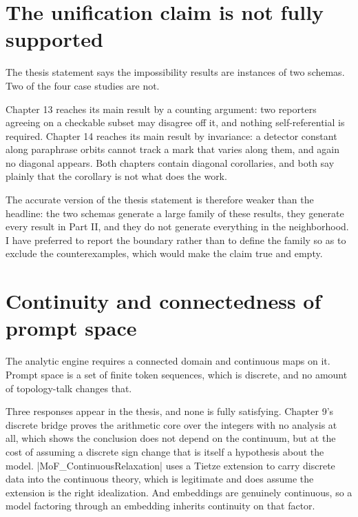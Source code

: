 \documentclass{memoir}
\begin{document}
\section{The unification claim is not fully supported}\label{Two--Schemas--of--Impossibility-005F-005F-005F--Machine--Checked--Limits--of--Trustworthy--Machine--Learning-005F-005F-005F--and--Why--They--Tighten--with--Capability----Limitations----The--unification--claim--is--not--fully--supported}

The thesis statement says the impossibility results are instances of two
schemas. Two of the four case studies are not.

Chapter 13 reaches its main result by a counting argument: two reporters
agreeing on a checkable subset may disagree off it, and nothing self-referential
is required. Chapter 14 reaches its main result by invariance: a detector
constant along paraphrase orbits cannot track a mark that varies along them, and
again no diagonal appears. Both chapters contain diagonal corollaries, and both
say plainly that the corollary is not what does the work.

The accurate version of the thesis statement is therefore weaker than the
headline: the two schemas generate a large family of these results, they
generate every result in Part II, and they do not generate everything in the
neighborhood. I have preferred to report the boundary rather than to define the
family so as to exclude the counterexamples, which would make the claim true and
empty.



\section{Continuity and connectedness of prompt space}\label{Two--Schemas--of--Impossibility-005F-005F-005F--Machine--Checked--Limits--of--Trustworthy--Machine--Learning-005F-005F-005F--and--Why--They--Tighten--with--Capability----Limitations----Continuity--and--connectedness--of--prompt--space}

The analytic engine requires a connected domain and continuous maps on it.
Prompt space is a set of finite token sequences, which is discrete, and no
amount of topology-talk changes that.

Three responses appear in the thesis, and none is fully satisfying. Chapter 9's
discrete bridge proves the arithmetic core over the integers with no analysis at
all, which shows the conclusion does not depend on the continuum, but at the
cost of assuming a discrete sign change that is itself a hypothesis about the
model. \LeanVerb|MoF_ContinuousRelaxation| uses a Tietze extension to carry discrete data
into the continuous theory, which is legitimate and does assume the extension is
the right idealization. And embeddings are genuinely continuous, so a model
factoring through an embedding inherits continuity on that factor.
\end{document}
